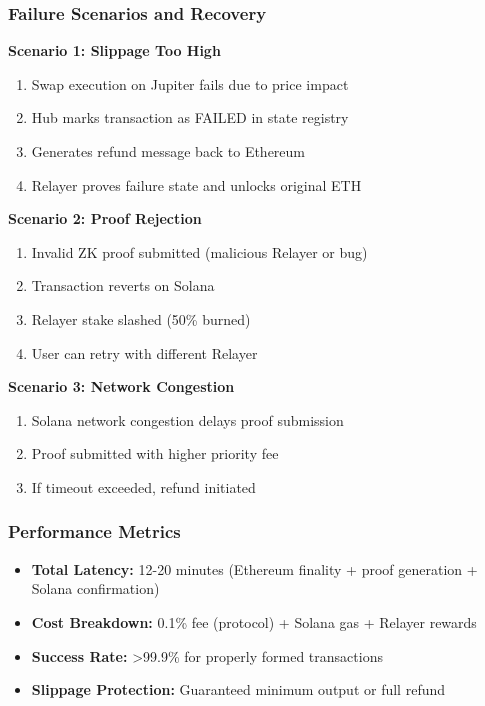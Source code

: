 \documentclass[11pt,a4paper]{article}
\begin{document}
\subsubsection{Failure Scenarios and Recovery}

\textbf{Scenario 1: Slippage Too High}
\begin{enumerate}
    \item Swap execution on Jupiter fails due to price impact
    \item Hub marks transaction as FAILED in state registry
    \item Generates refund message back to Ethereum
    \item Relayer proves failure state and unlocks original ETH
\end{enumerate}

\textbf{Scenario 2: Proof Rejection}
\begin{enumerate}
    \item Invalid ZK proof submitted (malicious Relayer or bug)
    \item Transaction reverts on Solana
    \item Relayer stake slashed (50\% burned)
    \item User can retry with different Relayer
\end{enumerate}

\textbf{Scenario 3: Network Congestion}
\begin{enumerate}
    \item Solana network congestion delays proof submission
    \item Proof submitted with higher priority fee
    \item If timeout exceeded, refund initiated
\end{enumerate}

\subsubsection{Performance Metrics}
\begin{itemize}
    \item \textbf{Total Latency:} 12-20 minutes (Ethereum finality + proof generation + Solana confirmation)
    \item \textbf{Cost Breakdown:} 0.1\% fee (protocol) + Solana gas + Relayer rewards
    \item \textbf{Success Rate:} >99.9\% for properly formed transactions
    \item \textbf{Slippage Protection:} Guaranteed minimum output or full refund
\end{itemize}
\end{document}
